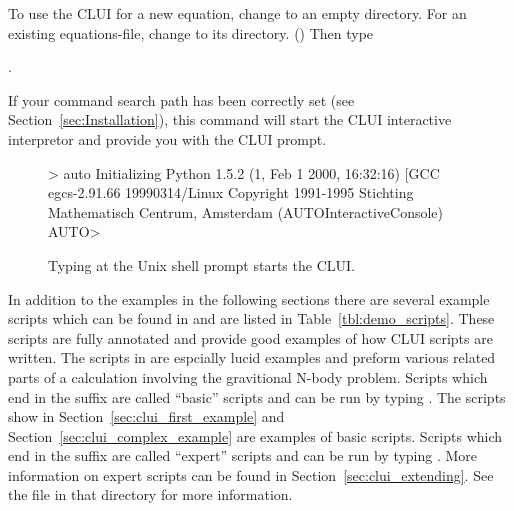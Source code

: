 To use the CLUI for a new equation, change to an empty directory.
For an existing equations-file, change to its directory.
()
Then type 

\centerline {.}

If your command search path has been correctly set (see
Section~\ref{sec:Installation}), this command will start the \AUTOc CLUI
interactive interpretor and provide you with the \AUTOc CLUI prompt.

\begin{figure}[htbp]
{\small 
\begin{center} \begin{boxedverbatim}
> auto
Initializing
Python 1.5.2 (1, Feb  1 2000, 16:32:16)  [GCC egcs-2.91.66 19990314/Linux 
Copyright 1991-1995 Stichting Mathematisch Centrum, Amsterdam
(AUTOInteractiveConsole)
AUTO> 
\end{boxedverbatim}
\end{center}
}
\caption[Starting the \AUTOc CLUI.]
{Typing  at the Unix shell prompt starts the
\AUTOc CLUI.  }
\label{exa:clui_starting}
\end{figure}

In addition to the examples in the following sections there are
several example scripts which can be found in
 and are listed in
Table~\ref{tbl:demo_scripts}.  These scripts are fully annotated and
provide good examples of how \AUTOc CLUI scripts are written.  The
scripts in  are espcially lucid
examples and preform various related parts of a calculation involving
the gravitional N-body problem.  
Scripts which end in the
suffix  are called ``basic'' scripts and can
be run by typing .
The scripts show in Section~\ref{sec:clui_first_example}
and Section~\ref{sec:clui_complex_example} are examples
of basic scripts.
Scripts which end in the
suffix  are called ``expert'' scripts and can
be run by typing .
More information on expert scripts can be 
found in Section~\ref{sec:clui_extending}.
See the  file in that
directory for more information.

